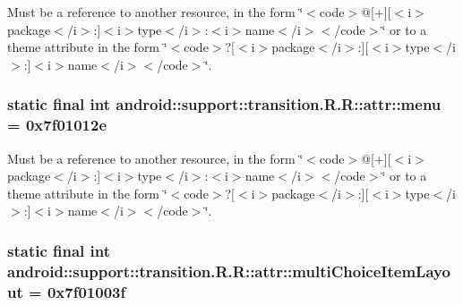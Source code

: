 Must be a reference to another resource, in the form \char`\"{}$<$code$>$@\mbox{[}+\mbox{]}\mbox{[}$<$i$>$package$<$/i$>$:\mbox{]}$<$i$>$type$<$/i$>$:$<$i$>$name$<$/i$>$$<$/code$>$\char`\"{} or to a theme attribute in the form \char`\"{}$<$code$>$?\mbox{[}$<$i$>$package$<$/i$>$:\mbox{]}\mbox{[}$<$i$>$type$<$/i$>$:\mbox{]}$<$i$>$name$<$/i$>$$<$/code$>$\char`\"{}. \hypertarget{classandroid_1_1support_1_1transition_1_1_r_1_1attr_55435f558bbb07b050f440e61c0af68e}{
\subsubsection[{menu}]{\setlength{\rightskip}{0pt plus 5cm}static final int android::support::transition.R.R::attr::menu = 0x7f01012e}}
\label{classandroid_1_1support_1_1transition_1_1_r_1_1attr_55435f558bbb07b050f440e61c0af68e}


Must be a reference to another resource, in the form \char`\"{}$<$code$>$@\mbox{[}+\mbox{]}\mbox{[}$<$i$>$package$<$/i$>$:\mbox{]}$<$i$>$type$<$/i$>$:$<$i$>$name$<$/i$>$$<$/code$>$\char`\"{} or to a theme attribute in the form \char`\"{}$<$code$>$?\mbox{[}$<$i$>$package$<$/i$>$:\mbox{]}\mbox{[}$<$i$>$type$<$/i$>$:\mbox{]}$<$i$>$name$<$/i$>$$<$/code$>$\char`\"{}. \hypertarget{classandroid_1_1support_1_1transition_1_1_r_1_1attr_b9b106f69bf777c800c68a0705d7fc08}{
\subsubsection[{multiChoiceItemLayout}]{\setlength{\rightskip}{0pt plus 5cm}static final int android::support::transition.R.R::attr::multiChoiceItemLayout = 0x7f01003f}}
\label{classandroid_1_1support_1_1transition_1_1_r_1_1attr_b9b106f69bf777c800c68a0705d7fc08}


